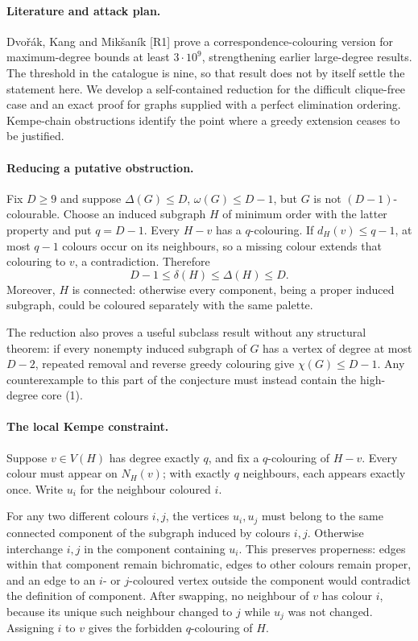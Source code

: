 \documentclass[11pt,a4paper]{article}
\begin{document}
\paragraph{Literature and attack plan.}
Dvořák, Kang and Mikšaník [R1] prove a correspondence-colouring version for maximum-degree bounds at least $3\cdot10^9$, strengthening earlier large-degree results. The threshold in the catalogue is nine, so that result does not by itself settle the statement here. We develop a self-contained reduction for the difficult clique-free case and an exact proof for graphs supplied with a perfect elimination ordering. Kempe-chain obstructions identify the point where a greedy extension ceases to be justified.

\paragraph{Reducing a putative obstruction.}
Fix $D\ge9$ and suppose $\Delta(G)\le D$, $\omega(G)\le D-1$, but $G$ is not $(D-1)$-colourable. Choose an induced subgraph $H$ of minimum order with the latter property and put $q=D-1$. Every $H-v$ has a $q$-colouring. If $d_H(v)\le q-1$, at most $q-1$ colours occur on its neighbours, so a missing colour extends that colouring to $v$, a contradiction. Therefore
\[
 D-1\le\delta(H)\le\Delta(H)\le D. \tag{1}
\]
Moreover, $H$ is connected: otherwise every component, being a proper induced subgraph, could be coloured separately with the same palette.

The reduction also proves a useful subclass result without any structural theorem: if every nonempty induced subgraph of $G$ has a vertex of degree at most $D-2$, repeated removal and reverse greedy colouring give $\chi(G)\le D-1$. Any counterexample to this part of the conjecture must instead contain the high-degree core (1).

\paragraph{The local Kempe constraint.}
Suppose $v\in V(H)$ has degree exactly $q$, and fix a $q$-colouring of $H-v$. Every colour must appear on $N_H(v)$; with exactly $q$ neighbours, each appears exactly once. Write $u_i$ for the neighbour coloured $i$.

For any two different colours $i,j$, the vertices $u_i,u_j$ must belong to the same connected component of the subgraph induced by colours $i,j$. Otherwise interchange $i,j$ in the component containing $u_i$. This preserves properness: edges within that component remain bichromatic, edges to other colours remain proper, and an edge to an $i$- or $j$-coloured vertex outside the component would contradict the definition of component. After swapping, no neighbour of $v$ has colour $i$, because its unique such neighbour changed to $j$ while $u_j$ was not changed. Assigning $i$ to $v$ gives the forbidden $q$-colouring of $H$.
\end{document}
